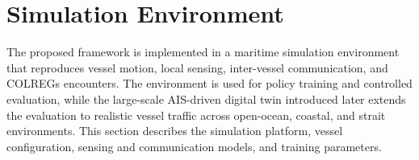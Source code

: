 \documentclass[final,5p,times,twocolumn]{elsarticle}
\begin{document}





\section{Simulation Environment}
\label{sec:simulation}

{\color{violet}
The proposed framework is implemented in a maritime simulation environment that reproduces vessel motion, local sensing, inter-vessel communication, and COLREGs encounters. The environment is used for policy training and controlled evaluation, while the large-scale AIS-driven digital twin introduced later extends the evaluation to realistic vessel traffic across open-ocean, coastal, and strait environments. This section describes the simulation platform, vessel configuration, sensing and communication models, and training parameters.
}
\end{document}
